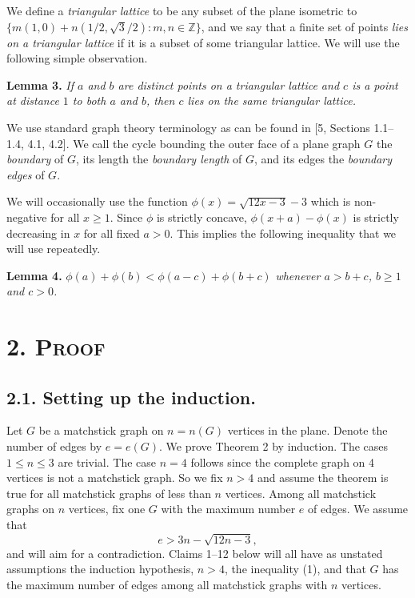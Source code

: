 \documentclass{article}
\begin{document}
We define a \textit{triangular lattice} to be any subset of the plane isometric to $\{m(1, 0) + n(1/2, \sqrt{3}/2) : m, n \in \mathbb{Z}\}$, and we say that a finite set of points \textit{lies on a triangular lattice} if it is a subset of some triangular lattice. We will use the following simple observation.

\textbf{Lemma 3.} \textit{If $a$ and $b$ are distinct points on a triangular lattice and $c$ is a point at distance $1$ to both $a$ and $b$, then $c$ lies on the same triangular lattice.}

We use standard graph theory terminology as can be found in [5, Sections 1.1–1.4, 4.1, 4.2]. We call the cycle bounding the outer face of a plane graph $G$ the \textit{boundary} of $G$, its length the \textit{boundary length} of $G$, and its edges the \textit{boundary edges} of $G$.

We will occasionally use the function $\phi(x) = \sqrt{12x - 3} - 3$ which is non-negative for all $x \ge 1$. Since $\phi$ is strictly concave, $\phi(x + a) - \phi(x)$ is strictly decreasing in $x$ for all fixed $a > 0$. This implies the following inequality that we will use repeatedly.

\textbf{Lemma 4.} $\phi(a) + \phi(b) < \phi(a - c) + \phi(b + c)$ \textit{whenever $a > b + c$, $b \ge 1$ and $c > 0$.}

\section*{2. \textsc{Proof}}

\subsection*{2.1. Setting up the induction.}

Let $G$ be a matchstick graph on $n = n(G)$ vertices in the plane. Denote the number of edges by $e = e(G)$. We prove Theorem 2 by induction. The cases $1 \le n \le 3$ are trivial. The case $n = 4$ follows since the complete graph on 4 vertices is not a matchstick graph. So we fix $n > 4$ and assume the theorem is true for all matchstick graphs of less than $n$ vertices. Among all matchstick graphs on $n$ vertices, fix one $G$ with the maximum number $e$ of edges. We assume that 
\begin{equation*}
e > 3n - \sqrt{12n-3}, \tag{1}
\end{equation*} and will aim for a contradiction. Claims 1–12 below will all have as unstated assumptions the induction hypothesis, $n > 4$, the inequality (1), and that $G$ has the maximum number of edges among all matchstick graphs with $n$ vertices.
\end{document}
